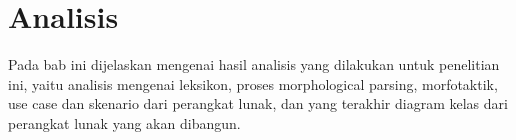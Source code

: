 \chapter{Analisis}
\label{chap:analisis}

Pada bab ini dijelaskan mengenai hasil analisis yang dilakukan untuk penelitian ini, yaitu analisis mengenai leksikon, proses morphological parsing, morfotaktik, use case dan skenario dari perangkat lunak, dan yang terakhir diagram kelas dari perangkat lunak yang akan dibangun.

%
%
%
%
%
%
